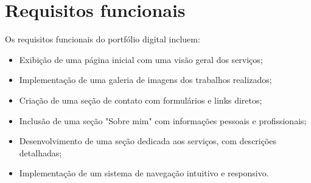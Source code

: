  \section{Requisitos funcionais}
Os requisitos funcionais do portfólio digital incluem:
\begin{itemize}
    \item Exibição de uma página inicial com uma visão geral dos serviços;
    \item Implementação de uma galeria de imagens dos trabalhos realizados;
    \item Criação de uma seção de contato com formulários e links diretos;
    \item Inclusão de uma seção "Sobre mim" com informações pessoais e profissionais;
    \item Desenvolvimento de uma seção dedicada aos serviços, com descrições detalhadas;
    \item Implementação de um sistema de navegação intuitivo e responsivo.
\end{itemize}










